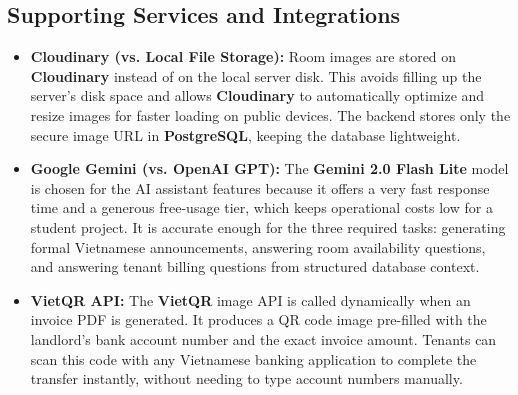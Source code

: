\subsection{Supporting Services and Integrations}
\begin{itemize}
    \item \textbf{Cloudinary (vs. Local File Storage):} Room images are stored on \textbf{Cloudinary} instead of on the local server disk. This avoids filling up the server's disk space and allows \textbf{Cloudinary} to automatically optimize and resize images for faster loading on public devices. The backend stores only the secure image URL in \textbf{PostgreSQL}, keeping the database lightweight.

    \item \textbf{Google Gemini (vs. OpenAI GPT):} The \textbf{Gemini 2.0 Flash Lite} model is chosen for the AI assistant features because it offers a very fast response time and a generous free-usage tier, which keeps operational costs low for a student project. It is accurate enough for the three required tasks: generating formal Vietnamese announcements, answering room availability questions, and answering tenant billing questions from structured database context.

    \item \textbf{VietQR API:} The \textbf{VietQR} image API is called dynamically when an invoice PDF is generated. It produces a QR code image pre-filled with the landlord's bank account number and the exact invoice amount. Tenants can scan this code with any Vietnamese banking application to complete the transfer instantly, without needing to type account numbers manually.
\end{itemize}

